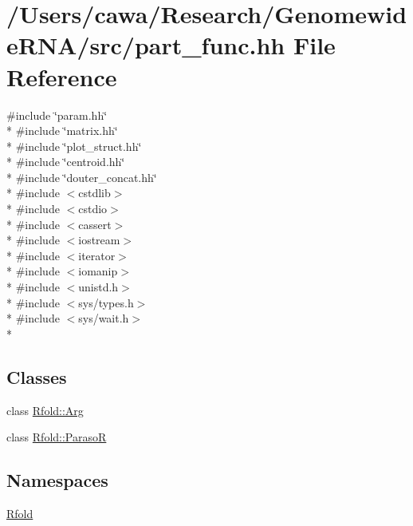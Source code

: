 \hypertarget{part__func_8hh}{\section{/\+Users/cawa/\+Research/\+Genomewide\+R\+N\+A/src/part\+\_\+func.hh File Reference}
\label{part__func_8hh}
}
{\ttfamily \#include \char`\"{}param.\+hh\char`\"{}}\\*
{\ttfamily \#include \char`\"{}matrix.\+hh\char`\"{}}\\*
{\ttfamily \#include \char`\"{}plot\+\_\+struct.\+hh\char`\"{}}\\*
{\ttfamily \#include \char`\"{}centroid.\+hh\char`\"{}}\\*
{\ttfamily \#include \char`\"{}douter\+\_\+concat.\+hh\char`\"{}}\\*
{\ttfamily \#include $<$cstdlib$>$}\\*
{\ttfamily \#include $<$cstdio$>$}\\*
{\ttfamily \#include $<$cassert$>$}\\*
{\ttfamily \#include $<$iostream$>$}\\*
{\ttfamily \#include $<$iterator$>$}\\*
{\ttfamily \#include $<$iomanip$>$}\\*
{\ttfamily \#include $<$unistd.\+h$>$}\\*
{\ttfamily \#include $<$sys/types.\+h$>$}\\*
{\ttfamily \#include $<$sys/wait.\+h$>$}\\*
\subsection*{Classes}
\begin{DoxyCompactItemize}
\item 
class \hyperlink{class_rfold_1_1_arg}{Rfold\+::\+Arg}
\item 
class \hyperlink{class_rfold_1_1_paraso_r}{Rfold\+::\+Paraso\+R}
\end{DoxyCompactItemize}
\subsection*{Namespaces}
\begin{DoxyCompactItemize}
\item 
 \hyperlink{namespace_rfold}{Rfold}
\end{DoxyCompactItemize}
